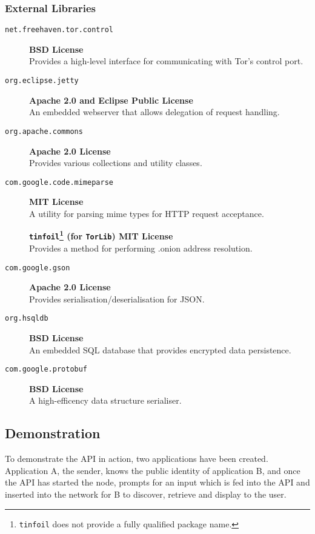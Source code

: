 		\subsubsection*{External Libraries}
			\begin{description}
				\item[\texttt{net.freehaven.tor.control}]\textbf{\hfill BSD License} \\
					Provides a high-level interface for communicating with Tor's control port.
				\item[\texttt{org.eclipse.jetty}]\textbf{\hfill Apache 2.0 and Eclipse Public License} \\
					An embedded webserver that allows delegation of request handling.
				\item[\texttt{org.apache.commons}]\textbf{\hfill Apache 2.0 License} \\
					Provides various collections and utility classes.
				\item[\texttt{com.google.code.mimeparse}]\textbf{\hfill MIT License} \\
					A utility for parsing mime types for HTTP request acceptance.
				\item[]\hspace*{-1ex}\textbf{\texttt{tinfoil}\footnote{\texttt{tinfoil} does not provide a fully qualified package name.} (for \texttt{TorLib}) \hfill MIT License}\\
					Provides a method for performing .onion address resolution.
				\item[\texttt{com.google.gson}]\textbf{\hfill Apache 2.0 License}\\
					Provides serialisation/deserialisation for JSON.
				\item[\texttt{org.hsqldb}]\textbf{\hfill BSD License}\\
					An embedded SQL database that provides encrypted data persistence.
				\item[\texttt{com.google.protobuf}]\textbf{\hfill BSD License}\\
					A high-efficency data structure serialiser.
			\end{description}
	\subsection{Demonstration}
		To demonstrate the API in action, two applications have been created. Application A, the sender, knows the public identity of application B, and once the API has started the node, prompts for an input which is fed into the API and inserted into the network for B to discover, retrieve and display to the user.
